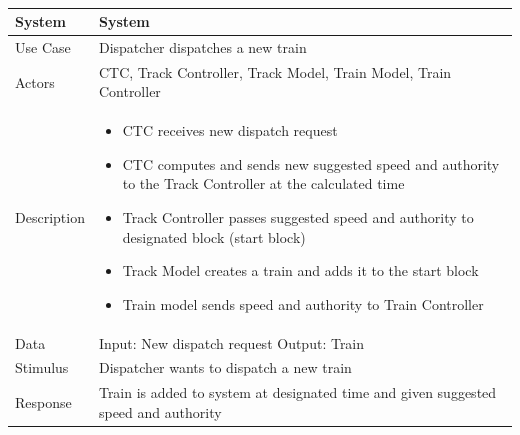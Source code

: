 \documentclass{article}
\begin{document}
    \paragraph{}
   \begin{longtable}{
    || >{\raggedright\arraybackslash}m{}
    | >{\raggedright\arraybackslash}m{}||}
    \hline
    \textbf{System} & \textbf{System} \\
    \hline
    Use Case & Dispatcher dispatches a new train\\
    \hline
    Actors & CTC, Track Controller, Track Model, Train Model, Train Controller\\
    \hline
    Description & \begin{itemize}
        \item CTC receives new dispatch request
        \item CTC computes and sends new suggested speed and authority to the Track Controller at the calculated time
        \item Track Controller passes suggested speed and authority to designated block (start block)
        \item Track Model creates a train and adds it to the start block
        \item Train model sends speed and authority to Train Controller
    \end{itemize}\\
    \hline
    Data & Input: New dispatch request \newline Output: Train\\
    \hline
    Stimulus & Dispatcher wants to dispatch a new train\\
    \hline
    Response & Train is added to system at designated time and given suggested speed and authority\\
    \hline
    \end{longtable}
\end{document}
